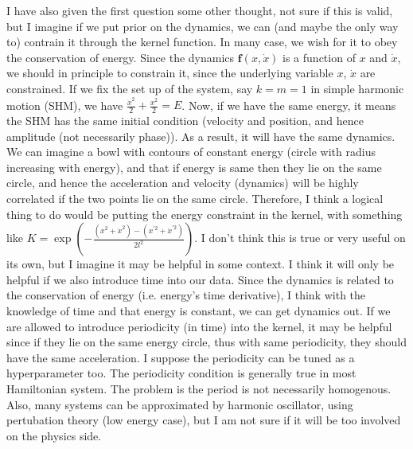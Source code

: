 \documentclass{article}
\begin{document}
I have also given the first question some other thought, not sure if this is valid, but I imagine if we put prior on the dynamics, we can (and maybe the only way to) contrain it through the kernel function. 
In many case, we wish for it to obey the conservation of energy.
Since the dynamics $\mathbf{f}(x, \dot{x})$ is a function of $x$ and $\dot{x}$, we should in principle to constrain it, since the underlying variable $x$, $\dot{x}$ are constrained.
If we fix the set up of the system, say $k=m=1$ in simple harmonic motion (SHM), we have $\frac{\dot{x}^2}{2}+\frac{x^2}{2}=E$. 
Now, if we have the same energy, it means the SHM has the same initial condition (velocity and position, and hence amplitude (not necessarily phase)). 
As a result, it will have the same dynamics.
We can imagine a bowl with contours of constant energy (circle with radius increasing with energy), and that if energy is same then they lie on the same circle, and hence the acceleration and velocity (dynamics) will be highly correlated if the two points lie on the same circle. 
Therefore, I think a logical thing to do would be putting the energy constraint in the kernel, with something like $K=\exp\left(-\frac{(x^2+\dot{x}^2)-(x^{'2}+\dot{x}^{'2})}{2l^2}\right).$ 
I don't think this is true or very useful on its own, but I imagine it may be helpful in some context. 
I think it will only be helpful if we also introduce time into our data. Since the dynamics is related to the conservation of energy (i.e. energy's time derivative), I think with the knowledge of time and that energy is constant, we can get dynamics out. 
If we are allowed to introduce periodicity (in time) into the kernel, it may be helpful since if they lie on the same energy circle, thus with same periodicity, they should have the same acceleration. I suppose the periodicity can be tuned as a hyperparameter too.
The periodicity condition is generally true in most Hamiltonian system.
The problem is the period is not necessarily homogenous.
Also, many systems can be approximated by harmonic oscillator, using pertubation theory (low energy case), but I am not sure if it will be too involved on the physics side. 
\end{document}
